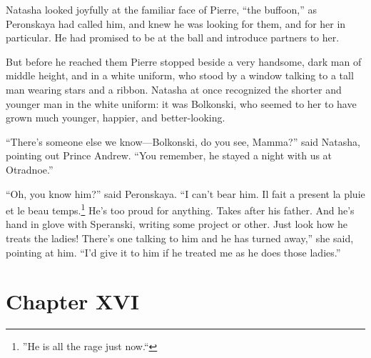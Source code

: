 Natasha looked joyfully at the familiar face of Pierre, ``the
buffoon,'' as Peronskaya had called him, and knew he was looking
for them, and for her in particular. He had promised to be at the
ball and introduce partners to her.

But before he reached them Pierre stopped beside a very handsome,
dark man of middle height, and in a white uniform, who stood by a
window talking to a tall man wearing stars and a ribbon. Natasha
at once recognized the shorter and younger man in the white
uniform: it was Bolkonski, who seemed to her to have grown much
younger, happier, and better-looking.

``There's someone else we know---Bolkonski, do you see, Mamma?''
said Natasha, pointing out Prince Andrew. ``You remember, he
stayed a night with us at Otradnoe.''

``Oh, you know him?'' said Peronskaya. ``I can't bear him. Il
fait a present la pluie et le beau temps.\footnote{''He is all
the rage just now.``} He's too proud for anything. Takes after
his father. And he's hand in glove with Speranski, writing some
project or other. Just look how he treats the ladies! There's one
talking to him and he has turned away,'' she said, pointing at
him. ``I'd give it to him if he treated me as he does those
ladies.''


\chapter*{Chapter XVI}
\ifaudio     
{} 
\fi

